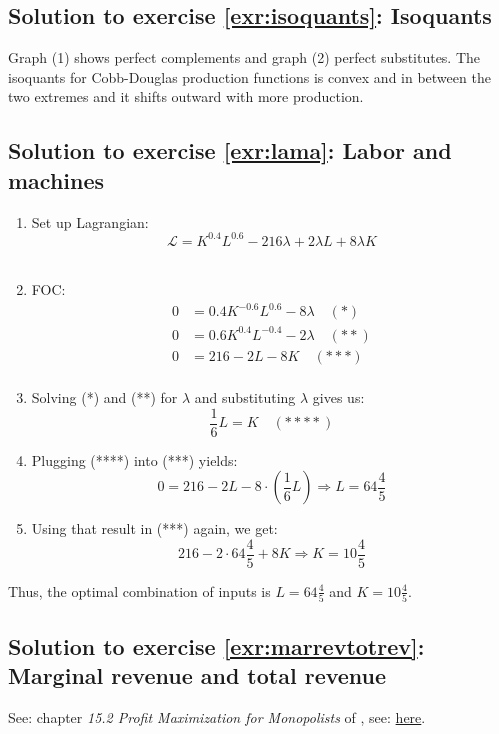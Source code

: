 \documentclass[
  12pt,
  oneside]{book}
\providecommand{\tightlist}{%
  \setlength{\itemsep}{0pt}\setlength{\parskip}{0pt}}
\theoremstyle{definition}
\theoremstyle{definition}
\theoremstyle{definition}
\theoremstyle{definition}
\theoremstyle{remark}
\begin{document}
\subsection*{Solution to exercise \ref{exr:isoquants}: Isoquants}\label{sol:isoquants}

Graph (1) shows perfect complements and graph (2) perfect substitutes. The isoquants for Cobb-Douglas production functions is convex and in between the two extremes and it shifts outward with more production.

\subsection*{Solution to exercise \ref{exr:lama}: Labor and machines}\label{sol:lama}

\begin{enumerate}
\def\labelenumi{\arabic{enumi}.}
\tightlist
\item
  Set up Lagrangian:
  \[\mathcal{L} = K^{0.4}L^{0.6} - 216\lambda + 2\lambda L + 8\lambda K\]\\
\item
  FOC:
  \begin{align*}
     0 &= 0.4K^{-0.6}L^{0.6} - 8\lambda \quad (*) \\
     0 &= 0.6K^{0.4}L^{-0.4} - 2\lambda \quad (**) \\
     0 &= 216 - 2L - 8K \quad (***) \\
  \end{align*}
\item
  Solving (*) and (**) for \(\lambda\) and substituting \(\lambda\) gives us:
  \[\frac{1}{6}L = K \quad (****)\]
\item
  Plugging (****) into (***) yields:
  \[0 = 216 - 2L - 8\cdot\left(\frac{1}{6}L\right) \Rightarrow L = 64\frac{4}{5}\]
\item
  Using that result in (***) again, we get:
  \[216 - 2\cdot 64\frac{4}{5} + 8K \Rightarrow K = 10\frac{4}{5}\]
\end{enumerate}

Thus, the optimal combination of inputs is \(L = 64\frac{4}{5}\) and \(K = 10\frac{4}{5}\).

\subsection*{Solution to exercise \ref{exr:marrevtotrev}: Marginal revenue and total revenue}\label{sol:marrevtotrev}

See: chapter \emph{15.2 Profit Maximization for Monopolists} of \citet{Emerson2020Intermediate}, see: \href{https://open.oregonstate.education/intermediatemicroeconomics/}{here}.
\end{document}
